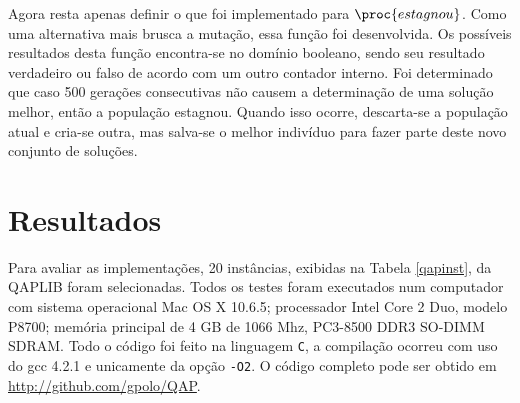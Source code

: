 Agora resta apenas definir o que foi implementado para
$\proc{estagnou}$. Como uma alternativa mais brusca a mutação, essa
função foi desenvolvida. Os possíveis resultados desta função
encontra-se no domínio booleano, sendo seu resultado verdadeiro ou
falso de acordo com um outro contador interno. Foi determinado que
caso 500 gerações consecutivas não causem a determinação de uma
solução melhor, então a população estagnou. Quando isso ocorre,
descarta-se a população atual e cria-se outra, mas salva-se o
melhor indivíduo para fazer parte deste novo conjunto de soluções.


\section{Resultados}

Para avaliar as implementações, 20 instâncias, exibidas na Tabela
\ref{qapinst}, da QAPLIB \cite{qaplib} foram selecionadas. Todos os
testes foram executados num computador com sistema operacional Mac OS
X 10.6.5; processador Intel Core 2 Duo, modelo P8700; memória
principal de 4 GB de 1066 Mhz, PC3-8500 DDR3 SO-DIMM SDRAM. Todo o
código foi feito na linguagem \texttt{C}, a compilação ocorreu com uso
do gcc 4.2.1 e unicamente da opção \verb!-O2!. O código completo pode
ser obtido em \url{http://github.com/gpolo/QAP}.


